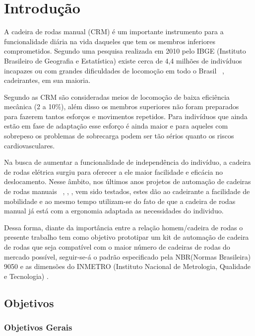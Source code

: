 \chapter[Introdução]{Introdução}

A cadeira de rodas manual (CRM) é um importante instrumento para a funcionalidade diária na vida daqueles que tem os membros inferiores comprometidos. Segundo uma pesquisa realizada em 2010 pelo IBGE (Instituto Brasileiro de Geografia e Estatística) existe cerca de 4,4 milhões de indivíduos incapazes ou com grandes dificuldades de locomoção em todo o Brasil ~\cite{ibge:cartilha:2010}, cadeirantes, em sua maioria.

Segundo \cite{sagawa} as CRM são consideradas meios de locomoção de baixa eficiência mecânica (2 a 10\%), além disso os membros superiores não foram preparados para fazerem tantos esforços e movimentos repetidos. Para indivíduos que ainda estão em fase de adaptação esse esforço é ainda maior e para aqueles com sobrepeso os problemas de sobrecarga podem ser tão sérios quanto os riscos cardiovasculares.

Na busca de aumentar a funcionalidade de independência do indivíduo, a cadeira de rodas elétrica surgiu para oferecer a ele maior facilidade e eficácia no deslocamento. Nesse âmbito, nos últimos anos projetos de automação de cadeiras de rodas manuais ~\cite{brunel:wheelchair:2004}, \cite{artigo_rudi}, \cite{patent_cadeira_rodas_eletrica},	 \cite{marcos:controle:2002}  vem sido testados, estes dão ao cadeirante a facilidade de mobilidade  e ao mesmo tempo utilizam-se do fato de que a cadeira de rodas manual já está com a ergonomia adaptada as necessidades do individuo.

Dessa forma, diante da importância entre a relação homem/cadeira de rodas o presente trabalho tem como objetivo prototipar um kit de automação de cadeira de rodas que seja compatível com o maior número de cadeiras de rodas do mercado possível, seguir-se-á o padrão especificado pela NBR(Normas Brasileira) 9050 \cite{nbr9050} e as dimensões do INMETRO (Instituto Nacional de Metrologia, Qualidade e Tecnologia) \cite{inmetro}.

\section{Objetivos}
\subsection{Objetivos Gerais}

